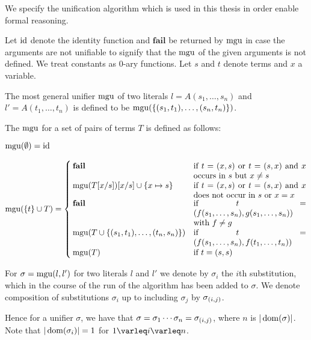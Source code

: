 We specify the unification algorithm which is used in this thesis in order enable formal reasoning.

\begin{defi}
	Let $\operatorname{id}$ denote the identity function and $\textbf{fail}$ be returned by $\operatorname{mgu}$ in case the arguments are not unifiable to signify that the $\operatorname{mgu}$ of the given arguments is not defined. We treat constants as $0$-ary functions.
	Let $s$ and $t$ denote terms and $x$ a variable.

	The most general unifier $\operatorname{mgu}$ of two literals $l = A(s_1,\dotsc, s_n)$ and $l' = A(t_1,\dots, t_n)$ is defined to be $\operatorname{mgu}(\{ (s_1, t_1), \dotsc, (s_n, t_n)\})$.


	The $\operatorname{mgu}$ for a set of pairs of terms $T$ is defined as follows:

	$
	\operatorname{mgu}(\emptyset) = \operatorname{id}
	$

	\newcommand{\aatahfdgasdfg}{.4\textwidth}
	$
	\mbox{$\mgu(\{t\} \cup T)$} =
	\begin{cases}
		\mathbf{fail} 				& \parbox[t]{\aatahfdgasdfg}{if $t = (x, s)$ or $t=(s,x)$ and $x$ occurs in $s$ but $x\neq s$ } \\
		\mgu(T\subst{x/s})\subst{x/s} \cup \{x\mapsto s\} 		& \parbox[t]{\aatahfdgasdfg}{if $t = (x, s)$ or $t=(s,x)$ and $x$ does not occur in $s$ or $x=x$} \\
		\mathbf{fail} 				& \parbox[t]{\aatahfdgasdfg}{if $t = (f(s_1,\dotsc,s_n), g(s_1,\dotsc,s_n))$ with $f\neq g$} \\
		\mgu(T \cup \{(s_1, t_1), \dotsc, (t_n, s_n)\})		& \parbox[t]{\aatahfdgasdfg}{if $t = (f(s_1,\dotsc,s_n), f(t_1,\dotsc,t_n))$} \\
		\mgu(T) 							& \text{if $t=(s, s)$} \\
	\end{cases}
	$

	For $\sigma = \operatorname{mgu}(l, l')$ for two literals $l$ and $l'$ we denote by $\sigma_i$ the $i$th substitution, which in the course of the run of the algorithm has been added to $\sigma$. 
	We denote composition of substitutions $\sigma_i$ up to including $\sigma_j$ by $\sigma_{(i,j)}$.
	\qedhere
\end{defi}

Hence for a unifier $\sigma$, we have that $ \sigma = \sigma_1\cdots\sigma_n = \sigma_{(i,j)}$, where $n$ is $|\operatorname{dom}(\sigma)|$.
Note that $|\operatorname{dom}(\sigma_i)| = 1$ for $1\varleq i \varleq n$.





